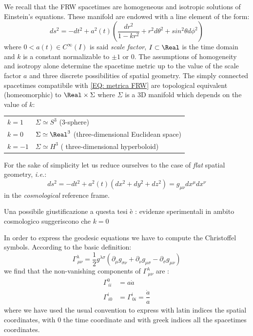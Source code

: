 \documentclass[Main]{subfiles}
\begin{document}
	We recall that the FRW spacetimes are homogeneous and isotropic solutions of Einstein’s equations.
	These manifold are endowed with a line element of the form:
	\begin{equation}\label{EQ: metrica FRW}
		ds^2 = -dt^2 + a^2(t) \left( \frac{dr^2}{1-k r^2} + r^2 d\theta^2 + sin^2\theta d\phi^2\right)
	\end{equation}
		where $0 < a(t) \in C^\infty	(I)$ is said \emph{scale factor}, $I \subset \Real$ is the time domain and $k$ is a constant normalizable to $\pm 1$ or $0$.
		The assumptions of homogeneity and isotropy alone determine the spacetime metric up to the value of the scale factor $a$ and three discrete possibilities of spatial geometry.
		The simply connected spacetimes compatibile with \ref{EQ: metrica FRW} are topological equivalent (homeomorphic) to $\Real \times \Sigma$ where $\Sigma$ is a 3D manifold which depends on the value of $k$:
		\begin{center}\begin{tabular}{l l}
			$k = 1$ & $\Sigma \simeq S^3$ (3-sphere)\\
			$k = 0$ & $\Sigma \simeq \Real^3$ (three-dimensional Euclidean space)\\
			$k = -1$ & $\Sigma \simeq H^3$ ( three-dimensional hyperboloid)\\		
		\end{tabular}\end{center}
		\vspace{2mm}
		
		For the sake of simplicity let us reduce ourselves to the case of \emph{flat} spatial geometry, \textit{i.e.}:
		\begin{displaymath}
			ds^2 = -dt^2 + a^2(t) \left( dx^2 + dy^2 + dz^2\right) = g_{\mu \nu} dx^\mu dx^\nu
		\end{displaymath}
		in the \emph{cosmological} reference frame.
\ifToninus
	\begin{Warning}
		Una possibile giustificazione a questa tesi è : evidenze sperimentali in ambito cosmologico suggeriscono che $k=0$
	\end{Warning}
\fi


		In order to express the geodesic equations we have to compute the Christoffel symbols. According to the basic definition:
		\begin{displaymath}
			\Gamma^\lambda_{\, \mu \nu} = \frac{1}{2} g^{\lambda \sigma } \left( \partial_\mu g_{\sigma \nu} + \partial_\nu g_{\mu \sigma} - \partial_{\sigma}g_{\mu \nu} \right)
		\end{displaymath}
		we find that the non-vanishing components of $\Gamma^\lambda_{\, \mu \nu}$ are : %
			\begin{eqnarray}
				\Gamma^0_{\, i i} &= a \dot{a} \\
				\Gamma^i_{\, i 0} &= \Gamma^i_{\, 0 i} = \dfrac{\dot{a}}{a}
			\end{eqnarray}
			where we have used the usual convention to express with latin indices the spatial coordinates, with $0$ the time coordinate and with greek indices all the spacetimes coordinates.
			
\end{document}
